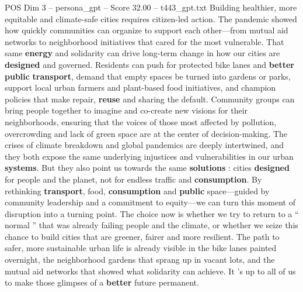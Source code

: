 \begin{textsample}{POS Dim 3 – persona\_gpt – Score 32.00 – t443\_gpt.txt}
Building healthier, more equitable and climate-safe cities requires citizen-led action.
The pandemic showed how quickly communities can organize to support each other—from mutual aid networks to neighborhood initiatives that cared for the most vulnerable.
That same \textbf{energy} and solidarity can drive long-term change in how our cities are \textbf{designed} and governed.
Residents can push for protected bike lanes and \textbf{better} \textbf{public} \textbf{transport}, demand that empty spaces be turned into gardens or parks, support local urban farmers and plant-based food initiatives, and champion policies that make repair, \textbf{reuse} and sharing the default.
Community groups can bring people together to imagine and co-create new visions for their neighborhoods, ensuring that the voices of those most affected by pollution, overcrowding and lack of green space are at the center of decision-making.
The crises of climate breakdown and global pandemics are deeply intertwined, and they both expose the same underlying injustices and vulnerabilities in our urban \textbf{systems}.
But they also point us towards the same \textbf{solutions} : cities \textbf{designed} for people and the planet, not for endless traffic and \textbf{consumption}.
By rethinking \textbf{transport}, food, \textbf{consumption} and \textbf{public} space—guided by community leadership and a commitment to equity—we can turn this moment of disruption into a turning point.
The choice now is whether we try to return to a “ normal ” that was already failing people and the climate, or whether we seize this chance to build cities that are greener, fairer and more resilient.
The path to safer, more sustainable urban life is already visible in the bike lanes painted overnight, the neighborhood gardens that sprang up in vacant lots, and the mutual aid networks that showed what solidarity can achieve.
It ’s up to all of us to make those glimpses of a \textbf{better} future permanent.

\end{textsample}

